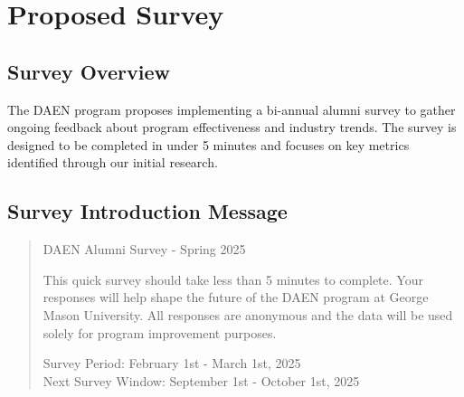 \documentclass[12pt,a4paper]{article}
\begin{document}
\newpage

\section{Proposed Survey}

\subsection{Survey Overview}
The DAEN program proposes implementing a bi-annual alumni survey to gather ongoing feedback about program effectiveness and industry trends. The survey is designed to be completed in under 5 minutes and focuses on key metrics identified through our initial research.

\subsection{Survey Introduction Message}
\begin{quote}
DAEN Alumni Survey - Spring 2025

This quick survey should take less than 5 minutes to complete. Your responses will help shape the future of the DAEN program at George Mason University. All responses are anonymous and the data will be used solely for program improvement purposes.

Survey Period: February 1st - March 1st, 2025\\
Next Survey Window: September 1st - October 1st, 2025
\end{quote}
\end{document}
